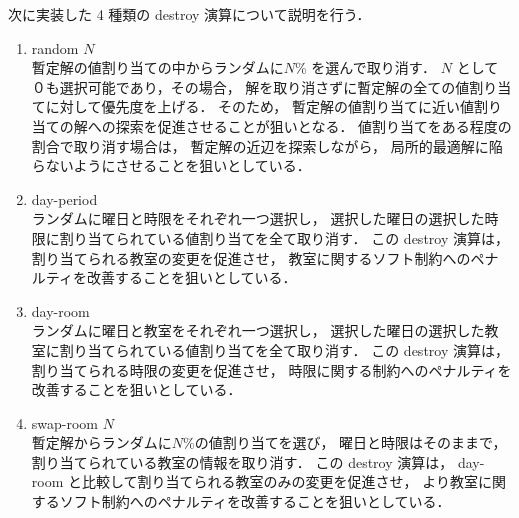 次に実装した 4 種類の destroy 演算について説明を行う．
    \begin{enumerate}
    \item random $N$\\
       暫定解の値割り当ての中からランダムに$N$\% を選んで取り消す．
       $N$ として０も選択可能であり，その場合，
       解を取り消さずに暫定解の全ての値割り当てに対して優先度を上げる．
       そのため，
       暫定解の値割り当てに近い値割り当ての解への探索を促進させることが狙いとなる．
       値割り当てをある程度の割合で取り消す場合は，
       暫定解の近辺を探索しながら，
       局所的最適解に陥らないようにさせることを狙いとしている．
    \item day-period\\
      ランダムに曜日と時限をそれぞれ一つ選択し，
      選択した曜日の選択した時限に割り当てられている値割り当てを全て取り消す．
      この destroy 演算は，
      割り当てられる教室の変更を促進させ，
      教室に関するソフト制約へのペナルティを改善することを狙いとしている．
  \item day-room\\
   ランダムに曜日と教室をそれぞれ一つ選択し，
   選択した曜日の選択した教室に割り当てられている値割り当てを全て取り消す．
   この destroy 演算は，
   割り当てられる時限の変更を促進させ，
   時限に関する制約へのペナルティを改善することを狙いとしている．
  \item swap-room $N$\\
    暫定解からランダムに$N$\%の値割り当てを選び，
    曜日と時限はそのままで，割り当てられている教室の情報を取り消す．
   この destroy 演算は，
   day-room と比較して割り当てられる教室のみの変更を促進させ，
   より教室に関するソフト制約へのペナルティを改善することを狙いとしている．
    
  \end{enumerate}